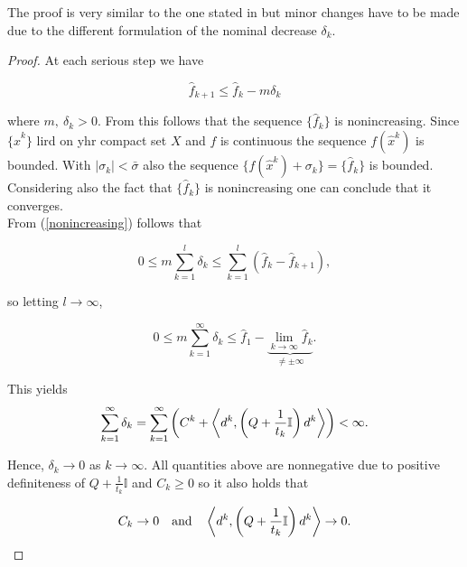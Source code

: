 The proof is very similar to the one stated in \cite{Hare2016} but minor changes have to be made due to the different formulation of the nominal decrease \(\delta_k\).

\begin{proof}
	At each serious step we have
	
	\begin{equation}
		\hat{f}_{k+1} \leq \hat{f}_k - m\delta_k
	\label{nonincreasing}
	\end{equation}
	
	where \(m, ~\delta_k > 0\). From this follows that the sequence \(\{\hat{f}_k\}\) is nonincreasing.
	Since \(\{\hat{x}^k\}\) lird on yhr compact set \(X\) and \(f\) is continuous the sequence \(f(\hat{x}^k)\) is bounded. %
	With \(|\sigma_k| < \bar{\sigma}\) also the sequence \(\{f(\hat{x}^k)+\sigma_k\} = \{\hat{f}_k\}\) is bounded. Considering also the fact that \(\{\hat{f}_k\}\) is nonincreasing one can conclude that it converges. \\
	From (\ref{nonincreasing}) follows that
	
	\begin{equation*}
		0 \leq m \sum_{k = 1}^l \delta_k \leq \sum_{k = 1}^l \left(\hat{f}_k-\hat{f}_{k+1}\right),
	\end{equation*}
	
	so letting \(l \to \infty\), 
	
	\begin{equation*}
		0 \leq m\sum_{k=1}^{\infty} \delta_k \leq \hat{f}_1 - \underbrace{\lim_{k \to \infty} \hat{f}_k}_{\neq \pm \infty}.
	\end{equation*}
	
	This yields
	\begin{equation*}
		\sum_{k = 1}^{\infty} \delta_k = \sum_{k=1}^{\infty}\left(C^k+\left\langle d^k,\left(Q+\frac{1}{t_k}\mathbb{I}\right)d^k\right\rangle \right) < \infty.
	\end{equation*}
	
	Hence, \(\delta_k \to 0\) as \(k \to \infty\). All quantities above are nonnegative due to positive definiteness of \(Q+\frac{1}{t_k}\mathbb{I}\) and \(C_k \geq 0\) so it also holds that
	
	\begin{equation*}
		C_k \to 0 \quad \text{and} \quad \left\langle d^k,\left(Q+\frac{1}{t_k}\mathbb{I}\right)d^k\right\rangle \to 0.
	\end{equation*}
	

\end{proof}
